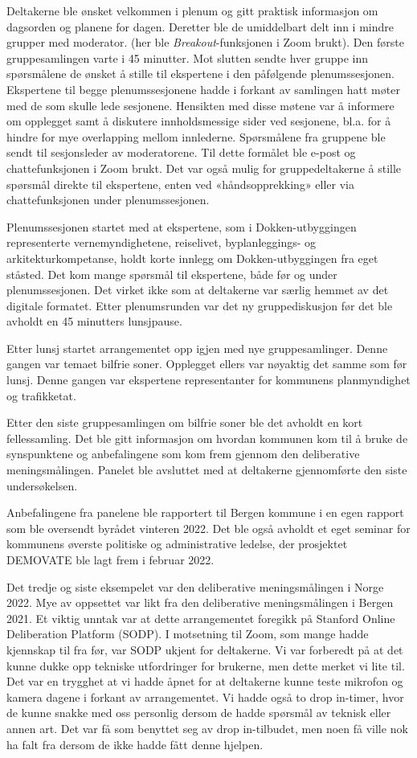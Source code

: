 \documentclass[
  12pt,
  a4paper, 12pt]{article}
\begin{document}
Deltakerne ble ønsket velkommen i plenum og gitt praktisk informasjon om dagsorden og planene for dagen. Deretter ble de umiddelbart delt inn i mindre grupper med moderator. (her ble \emph{Breakout}-funksjonen i Zoom brukt). Den første gruppesamlingen varte i 45 minutter. Mot slutten sendte hver gruppe inn spørsmålene de ønsket å stille til ekspertene i den påfølgende plenumssesjonen. Ekspertene til begge plenumssesjonene hadde i forkant av samlingen hatt møter med de som skulle lede sesjonene. Hensikten med disse møtene var å informere om opplegget samt å diskutere innholdsmessige sider ved sesjonene, bl.a. for å hindre for mye overlapping mellom innlederne. Spørsmålene fra gruppene ble sendt til sesjonsleder av moderatorene. Til dette formålet ble e-post og chattefunksjonen i Zoom brukt. Det var også mulig for gruppedeltakerne å stille spørsmål direkte til ekspertene, enten ved «håndsopprekking» eller via chattefunksjonen under plenumssesjonen.

Plenumssesjonen startet med at ekspertene, som i Dokken-utbyggingen representerte vernemyndighetene, reiselivet, byplanleggings- og arkitekturkompetanse, holdt korte innlegg om Dokken-utbyggingen fra eget ståsted. Det kom mange spørsmål til ekspertene, både før og under plenumssesjonen. Det virket ikke som at deltakerne var særlig hemmet av det digitale formatet. Etter plenumsrunden var det ny gruppediskusjon før det ble avholdt en 45 minutters lunsjpause.

Etter lunsj startet arrangementet opp igjen med nye gruppesamlinger. Denne gangen var temaet bilfrie soner. Opplegget ellers var nøyaktig det samme som før lunsj. Denne gangen var ekspertene representanter for kommunens planmyndighet og trafikketat.

Etter den siste gruppesamlingen om bilfrie soner ble det avholdt en kort fellessamling. Det ble gitt informasjon om hvordan kommunen kom til å bruke de synspunktene og anbefalingene som kom frem gjennom den deliberative meningsmålingen. Panelet ble avsluttet med at deltakerne gjennomførte den siste undersøkelsen.

Anbefalingene fra panelene ble rapportert til Bergen kommune i en egen rapport som ble oversendt byrådet vinteren 2022. Det ble også avholdt et eget seminar for kommunens øverste politiske og administrative ledelse, der prosjektet DEMOVATE ble lagt frem i februar 2022.

Det tredje og siste eksempelet var den deliberative meningsmålingen i Norge 2022. Mye av oppsettet var likt fra den deliberative meningsmålingen i Bergen 2021. Et viktig unntak var at dette arrangementet foregikk på Stanford Online Deliberation Platform (SODP). I motsetning til Zoom, som mange hadde kjennskap til fra før, var SODP ukjent for deltakerne. Vi var forberedt på at det kunne dukke opp tekniske utfordringer for brukerne, men dette merket vi lite til. Det var en trygghet at vi hadde åpnet for at deltakerne kunne teste mikrofon og kamera dagene i forkant av arrangementet. Vi hadde også to drop in-timer, hvor de kunne snakke med oss personlig dersom de hadde spørsmål av teknisk eller annen art. Det var få som benyttet seg av drop in-tilbudet, men noen få ville nok ha falt fra dersom de ikke hadde fått denne hjelpen.
\end{document}
